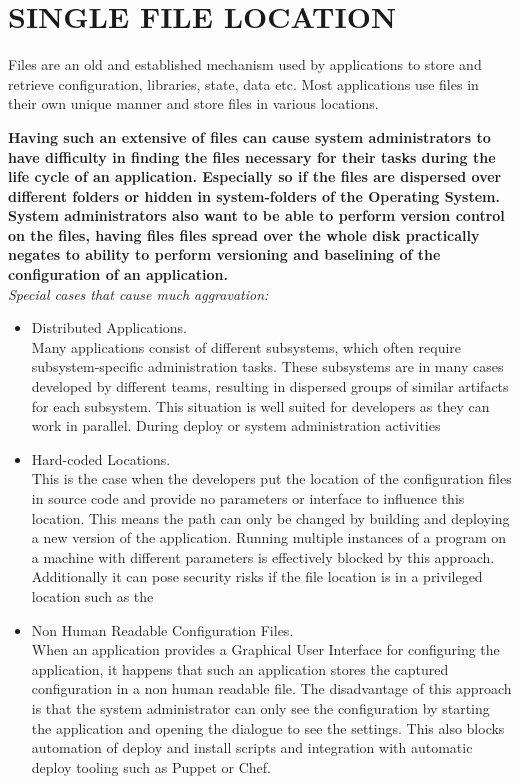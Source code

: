 \newpage
\section*{SINGLE FILE LOCATION}
Files are an old and established mechanism used by applications to store and retrieve configuration, libraries, state, data etc. Most applications use files in their own unique manner and store files in various locations.
\begin{center}
  
\end{center}

\textbf{Having such an extensive of files can cause system administrators to have difficulty in finding the files necessary for their tasks during the life cycle of an application. Especially so if the files are dispersed over different folders or hidden in system-folders of the Operating System. System administrators also want to be able to perform version control on the files, having files files spread  over the whole disk practically negates to ability to perform versioning and baselining of the configuration of an application.}\\

\textit{Special cases that cause much aggravation:}
\begin{itemize}
\item Distributed Applications.\\
Many applications consist of different subsystems, which often require  subsystem-specific administration tasks. These subsystems are in many cases developed by different teams, resulting in dispersed groups of similar artifacts for each subsystem. This situation is well suited for developers as they can work in parallel. During deploy or system administration activities 
\item Hard-coded Locations.\\
This is the case when the developers put the location of the configuration files in source code and provide no parameters or interface to influence this location. This means the path can only be changed by building and deploying a new version of the application. Running multiple instances of a program on a machine with different parameters is effectively blocked by this approach. Additionally it can pose security risks if the file location is in a privileged location such as the 
\item Non Human Readable Configuration Files.\\
When an application provides a Graphical User Interface for configuring the application, it happens that such an application stores the captured configuration in a non human readable file. The disadvantage of this approach is that the system administrator can only see the configuration by starting the application and opening the dialogue to see the settings. This also blocks automation of deploy and install scripts and integration with automatic deploy tooling such as Puppet or Chef.
\end{itemize}


